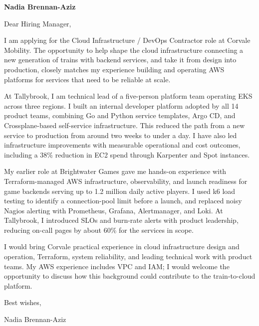 \documentclass[11pt,a4paper]{article}
\begin{document}
{\Large\bfseries\color{sectioncolor} Nadia Brennan-Aziz\par}
\vspace{0.6em}

Dear Hiring Manager,\par
\vspace{0.8em}

I am applying for the Cloud Infrastructure / DevOps Contractor role at Corvale Mobility. The opportunity to help shape the cloud infrastructure connecting a new generation of trains with backend services, and take it from design into production, closely matches my experience building and operating AWS platforms for services that need to be reliable at scale.\par
\vspace{0.8em}

At Tallybrook, I am technical lead of a five-person platform team operating EKS across three regions. I built an internal developer platform adopted by all 14 product teams, combining Go and Python service templates, Argo CD, and Crossplane-based self-service infrastructure. This reduced the path from a new service to production from around two weeks to under a day. I have also led infrastructure improvements with measurable operational and cost outcomes, including a 38\% reduction in EC2 spend through Karpenter and Spot instances.\par
\vspace{0.8em}

My earlier role at Brightwater Games gave me hands-on experience with Terraform-managed AWS infrastructure, observability, and launch readiness for game backends serving up to 1.2 million daily active players. I used k6 load testing to identify a connection-pool limit before a launch, and replaced noisy Nagios alerting with Prometheus, Grafana, Alertmanager, and Loki. At Tallybrook, I introduced SLOs and burn-rate alerts with product leadership, reducing on-call pages by about 60\% for the services in scope.\par
\vspace{0.8em}

I would bring Corvale practical experience in cloud infrastructure design and operation, Terraform, system reliability, and leading technical work with product teams. My AWS experience includes VPC and IAM; I would welcome the opportunity to discuss how this background could contribute to the train-to-cloud platform.\par
\vspace{0.8em}

Best wishes,\par
Nadia Brennan-Aziz
\end{document}
